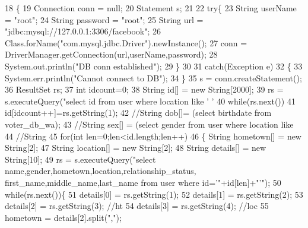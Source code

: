 \begin{DoxyCode}
18     \{
19         Connection conn = null;
20         Statement s;
21         
22         \textcolor{keywordflow}{try}\{
23             String userName = \textcolor{stringliteral}{"root"};
24             String password = \textcolor{stringliteral}{"root"};
25             String url = \textcolor{stringliteral}{"jdbc:mysql://127.0.0.1:3306/facebook"};
26                 Class.forName(\textcolor{stringliteral}{"com.mysql.jdbc.Driver"}).newInstance();
27                 conn = DriverManager.getConnection(url,userName,password);
28                 System.out.println(\textcolor{stringliteral}{"DB conn established"});
29         \}
30         
31         \textcolor{keywordflow}{catch}(Exception e)
32         \{
33             System.err.println(\textcolor{stringliteral}{"Cannot connect to DB"});
34         \}
35         s = conn.createStatement();
36         ResultSet rs;
37         \textcolor{keywordtype}{int} idcount=0;
38         String \textcolor{keywordtype}{id}[] = \textcolor{keyword}{new} String[2000]; 
39         rs = s.executeQuery(\textcolor{stringliteral}{"select id from user where location like '%
       '%
40         \textcolor{keywordflow}{while}(rs.next())
41             \textcolor{keywordtype}{id}[idcount++]=rs.getString(1);
42         \textcolor{comment}{//String dob[]=  (select birthdate from voter\_db\_wa);}
43         \textcolor{comment}{//String sex[] = (select gender from user where location like %
44         \textcolor{comment}{//String }
45         \textcolor{keywordflow}{for}(\textcolor{keywordtype}{int} len=0;len<\textcolor{keywordtype}{id}.length;len++)
46         \{   String hometown[] = \textcolor{keyword}{new} String[2];
47             String location[] = \textcolor{keyword}{new} String[2];
48             String details[] = \textcolor{keyword}{new} String[10]; 
49             rs = s.executeQuery(\textcolor{stringliteral}{"select name,gender,hometown,location,relationship\_status,
       first\_name,middle\_name,last\_name from user where id='"}+\textcolor{keywordtype}{id}[len]+\textcolor{stringliteral}{"'"});
50             \textcolor{keywordflow}{while}(rs.next())\{
51                 details[0] = rs.getString(1);
52                 details[1] = rs.getString(2);
53                 details[2] = rs.getString(3); \textcolor{comment}{//ht}
54                 details[3] = rs.getString(4); \textcolor{comment}{//loc}
55                 hometown  = details[2].split(\textcolor{stringliteral}{","});
}}
\end{DoxyCode}
